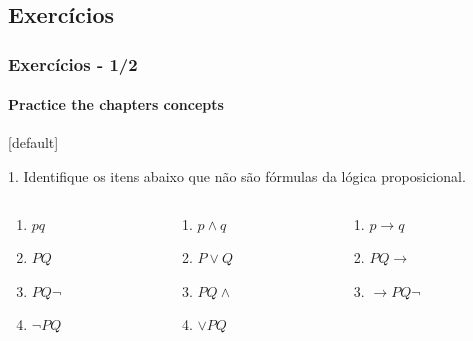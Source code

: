 \documentclass[10pt, headsepline, captions=tableabove, xcolor=table]{beamer}
\begin{document}
\subsection{Exercícios}
%
\begin{frame}[t] %
    \frametitle{Exercícios - 1/2}
    \framesubtitle{Practice the chapters concepts}
    \small
    [default]
    \begin{exampleblock}{1. Identifique os itens abaixo que não são fórmulas da lógica proposicional.}
        \begin{columns}[T]
            \begin{column}{0.15\textwidth}
                \begin{enumerate}[\bf a.]
                    \item $pq$
                    \item $PQ$
                    \item $PQ \lnot$
                    \item $\lnot PQ$
                \end{enumerate}
            \end{column}
            \hspace*{-5mm}
            \begin{column}{0.15\textwidth}
                \begin{enumerate}[\bf a.]
                    \addtocounter{enumi}{4}
                    \item $p \land q$
                    \item $P \lor Q$
                    \item $PQ \land$
                    \item $\lor PQ$
                \end{enumerate}
            \end{column}
            \hspace*{-5mm}
            \begin{column}{0.20\textwidth}
                \begin{enumerate}[\bf a.]
                    \addtocounter{enumi}{8}
                    \item $p \rightarrow q$
                    \item $PQ \rightarrow$
                    \item $\rightarrow PQ \lnot$

\end{enumerate}
\end{column}
\end{columns}
\end{exampleblock}
\end{frame}
\end{document}
